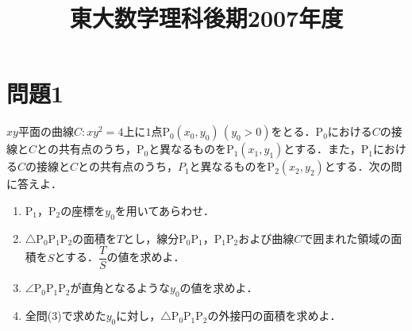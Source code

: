 \documentclass[unicode,12pt, A4j]{ltjsarticle}%
\title{東大数学理科後期2007年度}
\author{}
\date{}
\begin{document}
\maketitle

\section{問題1}
$xy$平面の曲線$C:xy^2=4$上に$1$点$\mathrm{P}_0(x_0,y_0)\, (y_0>0)$をとる．$\mathrm{P}_0$における$C$の接線と$C$との共有点のうち，$\mathrm{P}_0$と異なるものを$\mathrm{P}_1(x_1,y_1)$とする．また，$\mathrm{P}_1$における$C$の接線と$C$との共有点のうち，$P_1$と異なるものを$\mathrm{P}_2(x_2,y_2)$とする．次の問に答えよ．
\begin{enumerate}
 \item $\mathrm{P}_1$，$\mathrm{P}_2$の座標を$y_0$を用いてあらわせ．
 \item $\triangle \mathrm{P_0P_1P_2}$の面積を$T$とし，線分$\mathrm{P_0P_1}$，$\mathrm{P_1P_2}$および曲線$C$で囲まれた領域の面積を$S$とする．$\dfrac{T}{S}$の値を求めよ．
 \item $\angle \mathrm{P_0P_1P_2}$が直角となるような$y_0$の値を求めよ．
 \item 全問(3)で求めた$y_0$に対し，$\triangle \mathrm{P_0P_1P_2}$の外接円の面積を求めよ．
\end{enumerate}
\end{document}
